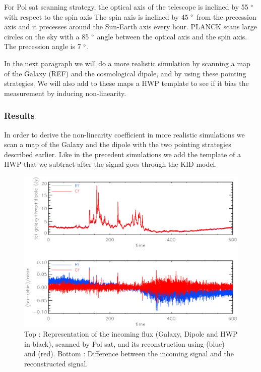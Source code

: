 For Pol sat scanning strategy, the optical axis of the telescope is inclined by 55 $\degree$ with respect to the spin axis The spin axis is inclined by 45 $\degree$ from the precession axis and it precesses around the Sun-Earth axis every hour.
PLANCK scans large circles on the sky with a 85 $\degree$ angle between the optical axis and the spin axis. The precession angle is 7 $\degree$.

In the next paragraph we will do a more realistic simulation by scanning a map of the Galaxy (REF) and the cosmological dipole, and by using these pointing strategies. We will also add to these maps a HWP template to see if it bias the measurement by inducing non-linearity.

\subsubsection{Results}
In order to derive the non-linearity coefficient in more realistic simulations we scan a map of the Galaxy and the dipole with the two pointing strategies described earlier. Like in the precedent simulations we add the template of a HWP that we subtract after the signal goes through the KID model.

\begin{figure}[h]
\center
	\includegraphics[scale=0.5]{Figures/toi-diff-polsat.eps}
	\caption{Top : Representation of the incoming flux (Galaxy, Dipole and HWP in black), scanned by Pol sat, and its reconstruction using \rf (blue) and \cf (red). Bottom : Difference between the incoming signal and the reconstructed signal.}
	\label{fig:toi-diff-polsat}
\end{figure}

